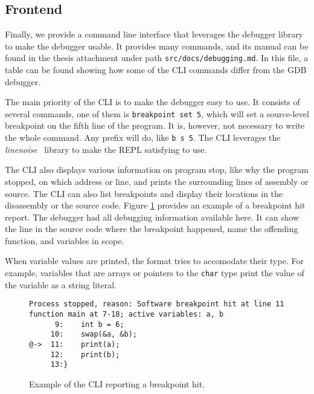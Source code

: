 \subsection{Frontend}
Finally, we provide a command line interface that leverages the debugger
library to make the debugger usable. It provides many commands, and its manual
can be found in the thesis attachment under path
\texttt{src/docs/debugging.md}. In this file, a table can be found showing how
some of the CLI commands differ from the GDB debugger.

The main priority of the CLI is to make the debugger easy to use. It consists
of several commands, one of them is \texttt{breakpoint set 5}, which will set a
source-level breakpoint on the fifth line of the program. It is, however, not
necessary to write the whole command. Any prefix will do, like \texttt{b s 5}.
The CLI leverages the \textit{linenoise}~\cite{linenoise} library to make the
REPL satisfying to use.

The CLI also displays various information on program stop, like why the program
stopped, on which address or line, and prints the surrounding lines of assembly
or source. The CLI can also list breakpoints and display their locations in the
disassembly or the source code. Figure \ref{fig:cli-hit} provides an example of
a breakpoint hit report. The debugger had all debugging information available
here. It can show the line in the source code where the breakpoint happened,
name the offending function, and variables in scope.

When variable values are printed, the format tries to accomodate their type.
For example, variables that are arrays or pointers to the \texttt{char} type
print the value of the variable as a string literal.

\begin{figure}
    \begin{lstlisting}
Process stopped, reason: Software breakpoint hit at line 11
function main at 7-18; active variables: a, b
      9:    int b = 6;
     10:    swap(&a, &b);
@->  11:    print(a);
     12:    print(b);
     13:}
    \end{lstlisting}
    \caption{Example of the CLI reporting a breakpoint hit.}
    \label{fig:cli-hit}
\end{figure}
